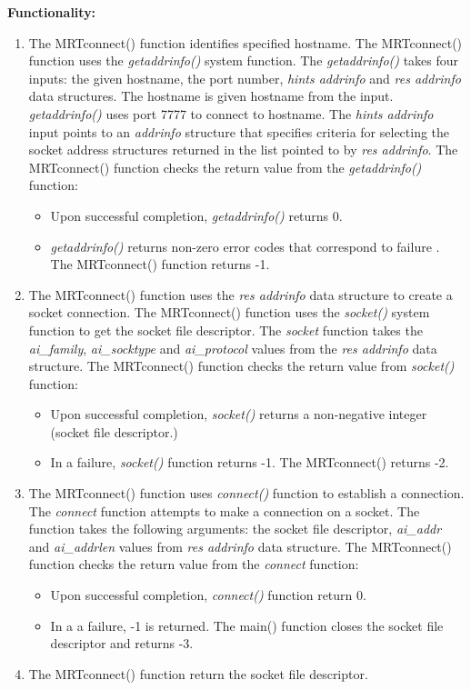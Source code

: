 \begin{enumerate}
\textbf{Functionality:}
  \begin{enumerate}
  \item{The MRTconnect() function identifies specified hostname. The MRTconnect() function uses the \emph{getaddrinfo()} system function. The \emph{getaddrinfo()} takes four inputs: the given hostname, the port number,   \emph{hints addrinfo} and \emph{res addrinfo} data structures. The hostname is given hostname from the input. \emph{getaddrinfo()} uses port 7777 to connect to hostname. The \emph{hints addrinfo} input points to an \emph{addrinfo} structure that specifies criteria for selecting the socket address structures  returned  in  the  list  pointed  to  by  \emph{res addrinfo}.  The MRTconnect() function checks the return value from the \emph{getaddrinfo()} function:}
  \begin{itemize}
  \item{Upon successful completion, \emph{getaddrinfo()} returns 0. }
  \item{\emph{getaddrinfo()} returns non-zero error codes that correspond to failure . The MRTconnect() function returns -1. }
  \end{itemize}
  
  \item{The MRTconnect() function uses the \emph{res addrinfo}  data structure to create a socket connection. The MRTconnect() function uses the \emph{socket()} system function to get the socket file descriptor.  The \emph{socket} function takes the \emph{ai\_family}, \emph{ai\_socktype} and \emph{ai\_protocol} values from the \emph{res addrinfo} data structure.  The MRTconnect() function checks the return value from \emph{socket()} function:  }
  \begin{itemize}
  \item{Upon  successful  completion, \emph{socket()} returns a non-negative integer (socket file descriptor.)}
  \item{In a failure, \emph{socket()} function returns -1. The MRTconnect() returns -2. }
  \end{itemize}
  
  \item{The MRTconnect() function uses \emph{connect()} function to establish a connection. The \emph{connect} function attempts to make a connection on a socket. The function takes the following arguments: the socket file descriptor, \emph{ai\_addr} and \emph{ai\_addrlen} values from 
  \emph{res addrinfo} data structure. The MRTconnect() function checks the return value from the \emph{connect} function: }
  \begin{itemize}
  \item{Upon successful completion, \emph{connect()} function return 0.}
  \item{In a a failure, -1 is returned. The main() function closes the socket file descriptor and returns -3. }
  \end{itemize}
   \item{The MRTconnect() function return the socket file descriptor.}
\end{enumerate}



\end{enumerate} %
